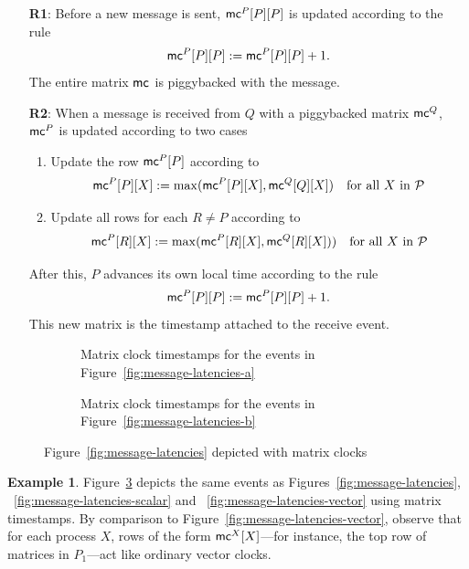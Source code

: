 \documentclass[]             %
{NASA}                       %
\theoremstyle{definition}
\newtheorem{example}[theorem]{Example}
\begin{document}
\begin{enumerate}
\item[\textbf{R1}:] Before a new message is sent, $\mathsf{mc}^{P}{[P]}{[P]}$ is updated according to the rule
  \[\mathsf{mc}^{P}{[P]}{[P]} := \mathsf{mc}^{P}{[P]}{[P]} + 1.\]
  The entire matrix $\mathsf{mc}^{}{}{}$ is piggybacked with the message.
\item[\textbf{R2}:] When a message is received from $Q$ with a piggybacked matrix $\mathsf{mc}^{Q}{}{}$,
  $\mathsf{mc}^{P}{}{}$ is updated according to two cases
  \begin{enumerate}
  \item Update the row $\mathsf{mc}^{P}{[P]}{}$ according to
    \[\mathsf{mc}^{P}{[P]}{[X]}:= \max( \mathsf{mc}^{P}{[P]}{[X]} ,  \mathsf{mc}^{Q}{[Q]}{[X]}) \quad \textrm{for all $X$ in $\mathcal{P}$}\]
  \item Update all rows for each $R \neq P$ according to
    \[\mathsf{mc}^{P}{[R]}{[X]} := \max(\mathsf{mc}^{P}{[R]}{[X]} ,  \mathsf{mc}^{Q}{[R]}{[X]})) \quad \textrm{for all $X$ in $\mathcal{P}$}\]
  \end{enumerate}
  After this, $P$ advances its own local time according to the rule
  \[ \mathsf{mc}^{P}{[P]}{[P]} := \mathsf{mc}^{P}{[P]}{[P]} + 1.\]
  This new matrix is the timestamp attached to the receive event.
\end{enumerate}

\begin{figure}[p]
  \begingroup
  \setlength\belowcaptionskip{4ex}
  \begin{subfigure}{1\textwidth}
    \caption{Matrix clock timestamps for the events in Figure~\ref{fig:message-latencies-a}}
    \label{fig:message-latencies-matrix-a}
  \end{subfigure}
  \begin{subfigure}{1\textwidth}
    \caption{Matrix clock timestamps for the events in Figure~\ref{fig:message-latencies-b}}
    \label{fig:message-latencies-matrix-b}
  \end{subfigure}
  \caption{Figure~\ref{fig:message-latencies} depicted with matrix clocks}
  \label{fig:message-latencies-matrix}
  \endgroup
\end{figure}

\begin{example}
  Figure~\ref{fig:message-latencies-matrix} depicts the same events as
  Figures~\ref{fig:message-latencies},
 ~\ref{fig:message-latencies-scalar} and
 ~\ref{fig:message-latencies-vector} using matrix timestamps. By
  comparison to Figure~\ref{fig:message-latencies-vector}, observe
  that for each process $X$, rows of the form $\mathsf{mc}^{X}{[X]}{}$---for
  instance, the top row of matrices in $P_1$---act like ordinary vector
  clocks.
\end{example}
\end{document}
